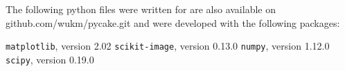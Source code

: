 
The following python files were written for are also available on github.com/wukm/pycake.git and were developed with the following packages:

\texttt{matplotlib}, version 2.02
\texttt{scikit-image}, version 0.13.0 
\texttt{numpy}, version 1.12.0
\texttt{scipy}, version 0.19.0  
